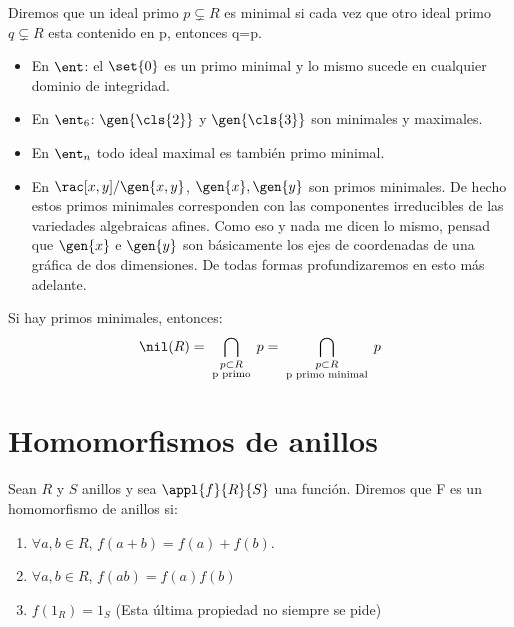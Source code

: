 \begin{defn}
	Diremos que un ideal primo $p \subsetneq R$ es minimal si cada vez que otro ideal primo $q \subsetneq R$ esta contenido en p, entonces q=p.
\end{defn}

\begin{example}
	\begin{itemize}
		\item En $\ent$: el $\set{0}$ es un primo minimal y lo mismo sucede en cualquier dominio de integridad.
		\item En $\ent_6$: $\gen{\cls{2}}$ y $\gen{\cls{3}}$ son minimales y maximales.
		\item En $\ent_n$ todo ideal maximal es también primo minimal.
		\item En $\rac[x,y]/\gen{x,y}$, $\gen{x},\gen{y}$ son primos minimales. De hecho estos primos minimales corresponden con las componentes irreducibles de las variedades  algebraicas afines. Como eso y nada me dicen lo mismo, pensad que $\gen{x}$ e $\gen{y}$ son básicamente los ejes de coordenadas de una gráfica de dos dimensiones. De todas formas profundizaremos en esto más adelante.
	\end{itemize}
\end{example}

\obs Si hay primos minimales, entonces:
$$ \nil(R)=\bigcap_{\substack{p\subset R \\ \text{ p primo }}} p = \bigcap_{\substack{p\subset R \\ \text{ p primo minimal }}}p $$

\section{Homomorfismos de anillos}

\begin{defn} \label{def:Homomorfismo} Sean $R$ y $S$ anillos y sea $\appl{f}{R}{S}$ una función. Diremos que F es un homomorfismo de anillos si:
\begin{enumerate}
	\item $\forall a,b \in R$, $f(a+b)=f(a)+f(b)$.
	\item $\forall a,b \in R$, $f(ab)=f(a)f(b)$
	\item $f(1_R)=1_S$ (Esta última propiedad no siempre se pide)
\end{enumerate}
\end{defn}

